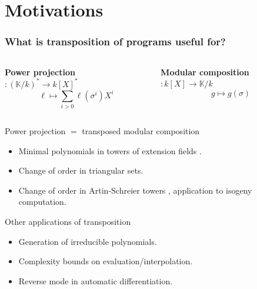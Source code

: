 \documentclass[10pt]{beamer}
\newcommand{\K}{\mathbb{K}}
\newcommand{\ra}{\rightarrow}
\begin{document}

\section{Motivations}

\begin{frame}
  \frametitle{What is transposition of programs useful for?}

  \begin{columns}
    \begin{column}{0.5\textwidth}
      \begin{center}
        \textbf{Power projection}$:(\K/k)^\ast\ra k[X]^\ast$
        \[\ell \mapsto \sum_{i>0} \ell(\sigma^i) X^i\]
      \end{center}
    \end{column}
    \begin{column}{0.5\textwidth}
      \begin{center}
        \textbf{Modular composition}$:k[X]\ra\K/k$
        \[g\mapsto g(\sigma)\]
      \end{center}
    \end{column}
  \end{columns}

  \begin{block}{Power projection $=$ transposed modular composition}
    \begin{itemize}
    \item Minimal polynomials in towers of extension fields \cite{Sho95}.
    \item Change of order in triangular sets.
    \item Change of order in Artin-Schreier towers \cite{DFS09},
      application to isogeny computation.
    \end{itemize}
  \end{block}

  \begin{block}{Other applications of transposition}
    \begin{itemize}
    \item Generation of irreducible polynomials.
    \item Complexity bounds on evaluation/interpolation.
    \item Reverse mode in automatic differentiation.
    \end{itemize}
  \end{block}
\end{frame}

\end{document}

